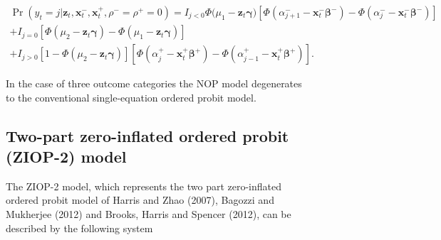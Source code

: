 \documentclass[letterpaper,fleqn,12pt]{article}
\begin{document}
\begin{figure}[H]
\begin{onehalfspace}
\begin{center}
$%
\begin{array}{l}
\Pr (y_{t}=j|\mathbf{z}_{t},\mathbf{x}_{t}^{-},\mathbf{x}_{t}^{+},\rho
^{-}=\rho ^{+}=0)=I_{j<0}\Phi (\mu _{1}-\mathbf{z}_{t}\mathbf{\gamma )}[\Phi
(\alpha _{j+1}^{-}-\mathbf{x}_{t}^{-}\mathbf{\beta }^{-})-\Phi (\alpha
_{j}^{-}-\mathbf{x}_{t}^{-}\mathbf{\beta }^{-})] \\ 
+I_{j=0}[\Phi (\mu _{2}-\mathbf{z}_{t}\mathbf{\gamma })-\Phi (\mu _{1}-%
\mathbf{z}_{t}\mathbf{\gamma })] \\ 
+I_{j>0}[1-\Phi (\mu _{2}-\mathbf{z}_{t}\mathbf{\gamma })][\Phi (\alpha
_{j}^{+}-\mathbf{x}_{t}^{+}\mathbf{\beta }^{+})-\Phi (\alpha _{j-1}^{+}-%
\mathbf{x}_{t}^{+}\mathbf{\beta }^{+})]\text{.}%
\end{array}%
$
\end{center}

In the case of three outcome categories the NOP model degenerates to the
conventional single-equation ordered probit model.

\subsection{Two-part zero-inflated ordered probit (ZIOP-2) model}

The ZIOP-2 model, which represents the two part zero-inflated ordered probit
model of Harris and Zhao (2007), Bagozzi and Mukherjee (2012) and Brooks,
Harris and Spencer (2012), can be described by the following system

\medskip


\end{onehalfspace}
\end{figure}
\end{document}
